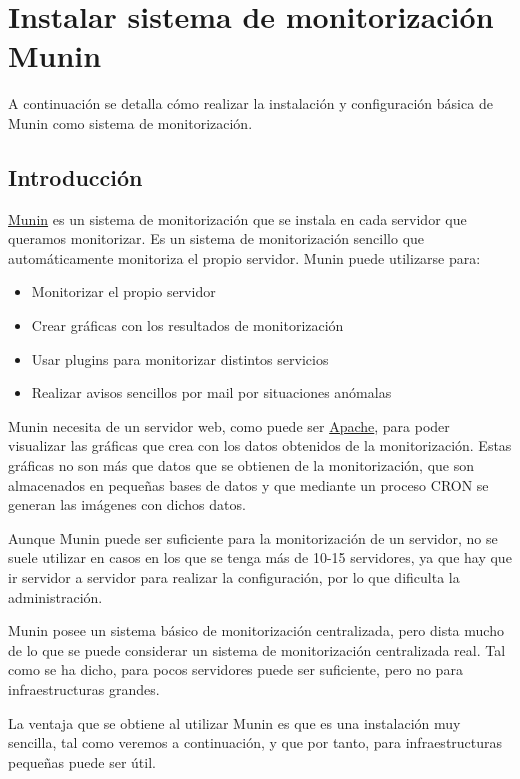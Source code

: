\hypertarget{instalar_munin}{}
\chapter{Instalar sistema de monitorización Munin}
A continuación se detalla cómo realizar la instalación y configuración básica de Munin como sistema de monitorización.

\section{Introducción}

\href{https://munin-monitoring.org/}{Munin} es un sistema de monitorización que se instala en cada servidor que queramos monitorizar. Es un sistema de monitorización sencillo que automáticamente monitoriza el propio servidor. Munin puede utilizarse para:

\begin{itemize}
    \item Monitorizar el propio servidor
    \item Crear gráficas con los resultados de monitorización
    \item Usar plugins para monitorizar distintos servicios
    \item Realizar avisos sencillos por mail por situaciones anómalas
\end{itemize}

Munin necesita de un servidor web, como puede ser \href{https://httpd.apache.org/}{Apache}, para poder visualizar las gráficas que crea con los datos obtenidos de la monitorización. Estas gráficas no son más que datos que se obtienen de la monitorización, que son almacenados en pequeñas bases de datos y que mediante un proceso CRON se generan las imágenes con dichos datos.

Aunque Munin puede ser suficiente para la monitorización de un servidor, no se suele utilizar en casos en los que se tenga más de 10-15 servidores, ya que hay que ir servidor a servidor para realizar la configuración, por lo que dificulta la administración.

Munin posee un sistema básico de monitorización centralizada, pero dista mucho de lo que se puede considerar un sistema de monitorización centralizada real. Tal como se ha dicho, para pocos servidores puede ser suficiente, pero no para infraestructuras grandes.

La ventaja que se obtiene al utilizar Munin es que es una instalación muy sencilla, tal como veremos a continuación, y que por tanto, para infraestructuras pequeñas puede ser útil.


